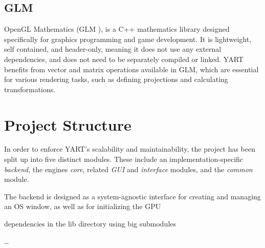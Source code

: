 \subsection{GLM}

OpenGL Mathematics (GLM \supercite{GLM}), is a C++ mathematics library designed specifically for graphics programming and game development.
It is lightweight, self contained, and header-only, meaning it does not use any external dependencies, and does not need to be separately compiled or linked.
YART benefits from vector and matrix operations available in GLM, which are essential for various rendering tasks, such as defining projections and calculating transformations.

\section{Project Structure}

In order to enforce YART's scalability and maintainability, the project has been split up into five distinct modules. 
These include an implementation-specific \textit{backend}, the engines \textit{core}, related \textit{GUI} and \textit{interface} modules, and the \textit{common} module.

The backend is designed as a system-agnostic interface for creating and managing an OS window, as well as for initializing the GPU 

dependencies in the lib directory using big submodules

\dots
